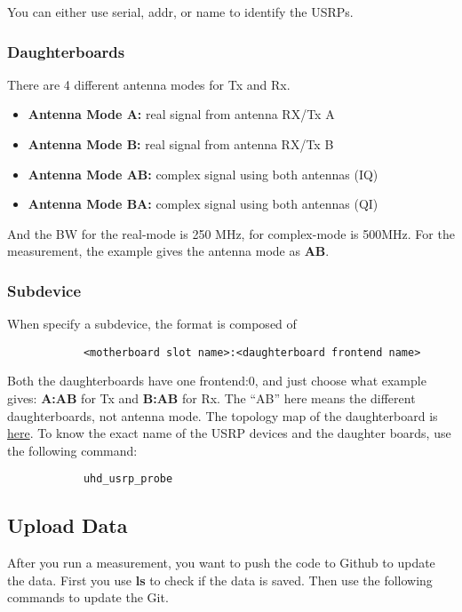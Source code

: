 \documentclass{article}
\begin{document}
        You can either use serial, addr, or name to identify the USRPs. 
        
        \subsubsection{Daughterboards}
        There are 4 different antenna modes for Tx and Rx. 
        \begin{itemize}
            \item \textbf{Antenna Mode A:} real signal from antenna RX/Tx A
            \item \textbf{Antenna Mode B:} real signal from antenna RX/Tx B
            \item \textbf{Antenna Mode AB:} complex signal using both antennas (IQ)
            \item \textbf{Antenna Mode BA:} complex signal using both antennas (QI)
        \end{itemize}
        
        And the BW for the real-mode is 250 MHz, for complex-mode is 500MHz. For the measurement, the example gives the antenna mode as \textbf{AB}. 
        
        \subsubsection{Subdevice}
        When specify a subdevice, the format is composed of
        \begin{verbatim}
            <motherboard slot name>:<daughterboard frontend name>
        \end{verbatim}
        Both the daughterboards have one frontend:0, and just choose what example gives: \textbf{A:AB} for Tx and \textbf{B:AB} for Rx. The ``AB'' here means the different daughterboards, not antenna mode. The topology map of the daughterboard is \href{https://kb.ettus.com/USRP_X_Series_Quick_Start_(Daughterboard_Installation)}{here}. To know the exact name of the USRP devices and the daughter boards, use the following command:
        \begin{verbatim}
            uhd_usrp_probe
        \end{verbatim}
        
        

        
        \vspace{2em}
        \newpage
        
        
    \subsection{Upload Data}
        After you run a measurement, you want to push the code to Github to update the data. First you use \textbf{ls} to check if the data is saved. Then use the following commands to update the Git. 
\end{document}
